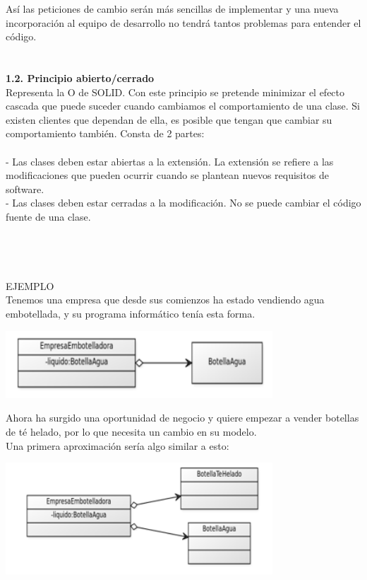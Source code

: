\documentclass[11pt,letterpaper]{article}
\begin{document}
Así las peticiones de cambio serán más sencillas de implementar y una nueva incorporación al equipo de desarrollo no tendrá tantos problemas para entender el código.
\\\\\\
\textbf{ 1.2. Principio abierto/cerrado } 
\\Representa la O de SOLID. Con este principio se pretende minimizar el efecto cascada que puede suceder cuando cambiamos el comportamiento de una clase. Si existen clientes que dependan de ella, es posible que tengan que cambiar su comportamiento también.
Consta de 2 partes:\\\\
{- Las clases deben estar abiertas a la extensión. La extensión se refiere a las modificaciones que pueden ocurrir cuando se plantean nuevos requisitos de software.}\\
{- Las clases deben estar cerradas a la modificación. No se puede cambiar el código fuente de una clase.}
\\\\\\\\\\
EJEMPLO\\
Tenemos una empresa que desde sus comienzos ha estado vendiendo agua embotellada,
y su programa informático tenía esta forma.\\
\begin{center}
	\includegraphics[width=10cm]{./imagenes/3.png} 
\end{center}
Ahora ha surgido una oportunidad de negocio y quiere empezar a vender botellas de té helado, por lo que necesita un cambio en su modelo.\\
Una primera aproximación sería algo similar a esto:\\
\begin{center}
	\includegraphics[width=10cm]{./imagenes/4.png} 
\end{center}
\end{document}
